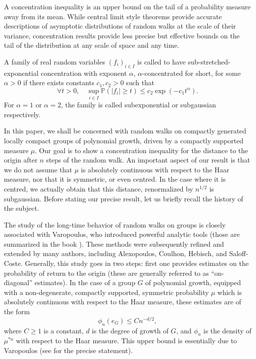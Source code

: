 \documentclass[11pt,leqno]{article}
\theoremstyle{plain}
\theoremstyle{definition}
\theoremstyle{remark}
\numberwithin{equation}{section}
\begin{document}
A concentration inequality is an upper bound on the tail of a probability measure away from its mean. While central limit style theorems provide accurate descriptions of asymptotic distributions of random walks at the scale of their variance, concentration results provide less precise but effective bounds on the tail of the distribution at any scale of space and any time. %

A family of real random variables $(f_i)_{i\in I}$ is called to have sub-stretched-exponential concentration with exponent $\alpha$, $\alpha$-concentrated for short, for some $\alpha>0$ if there exists constants $c_1,c_2 >0$ such that
\[
\forall t>0, \quad \sup_{i\in I} \mathbb{P}\left(|f_i|\ge t\right) \le c_2\exp\left(-c_1 t^{\alpha}\right).
\]
For $\alpha=1$ or $\alpha=2$, the family is called subexponential or subgaussian respectively. 

In this paper, we shall be concerned with random walks on compactly generated locally compact groups of polynomial growth, driven by a compactly supported measure $\mu$. Our goal is to show a concentration inequality for the distance to the origin after $n$ steps of the random walk. An important aspect of our result is that we do not assume that $\mu$ is absolutely continuous with respect to the Haar measure, nor that it is symmetric, or even centred. In the case where it is centred, we actually obtain that this distance, renormalized by $n^{1/2}$ is subgaussian. Before stating our precise result, let us briefly recall the history of the subject. 

The study of the long-time behavior of random walks on groups is closely associated with Varopoulos, who introduced powerful analytic tools (those are summarized in the book \cite{Varobook}). These methods were subsequently refined and extended by many authors, including Alexopoulos, Coulhon, Hebisch, and Saloff-Coste. Generally, this study goes in two steps: first one provides estimates on the probability of return to the origin (these are generally referred to as ``on-diagonal'' estimates). In the case of a group $G$ of polynomial growth, equipped with a non-degenerate, compactly supported, symmetric probability $\mu$ which is absolutely continuous with respect to the Haar measure, these estimates are of the form 
\begin{equation}\label{eq:Ondiag}
\phi_n(e_G)\leq C n^{-d/2},
\end{equation}
where $C\geq 1$ is a constant, $d$ is the degree of growth of $G$, and $\phi_n$ is the density of $\mu^{*n}$ with respect to the Haar measure. This upper bound is essentially due to Varopoulos (see \cite[Theorem 4.1]{HebishSaloff} for the precise statement).
\end{document}

